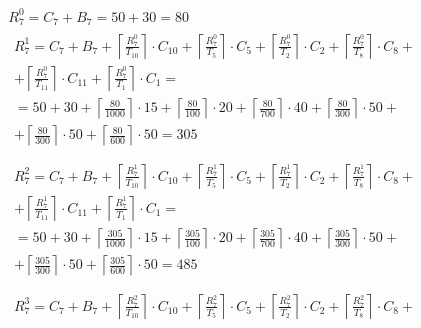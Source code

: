 \begin{gather*}
  R_7^0 = C_7 + B_7 = 50 + 30 = 80 \\
  \begin{multlined}
    R_7^1 = C_7 + B_7 + \left\lceil\frac{R_7^0}{T_{10}}\right\rceil\cdot C_{10} + %
    \left\lceil\frac{R_7^0}{T_5}\right\rceil\cdot C_5 + %
    \left\lceil\frac{R_7^0}{T_2}\right\rceil\cdot C_2 + %
    \left\lceil\frac{R_7^0}{T_8}\right\rceil\cdot C_8 + \\%
    + \left\lceil\frac{R_7^0}{T_{11}}\right\rceil\cdot C_{11} + %
    \left\lceil\frac{R_7^0}{T_1}\right\rceil\cdot C_1 = \\%
    = 50 + 30 + \left\lceil\frac{80}{1000}\right\rceil\cdot 15 + %
    \left\lceil\frac{80}{100}\right\rceil\cdot 20 + %
    \left\lceil\frac{80}{700}\right\rceil\cdot 40 + %
    \left\lceil\frac{80}{300}\right\rceil\cdot 50 + \\%
    + \left\lceil\frac{80}{300}\right\rceil\cdot 50 + %
    \left\lceil\frac{80}{600}\right\rceil\cdot 50 = 305 \\
  \end{multlined} \\
  \begin{multlined}
    R_7^2 = C_7 + B_7 + \left\lceil\frac{R_7^1}{T_{10}}\right\rceil\cdot C_{10} + %
    \left\lceil\frac{R_7^1}{T_5}\right\rceil\cdot C_5 + %
    \left\lceil\frac{R_7^1}{T_2}\right\rceil\cdot C_2 + %
    \left\lceil\frac{R_7^1}{T_8}\right\rceil\cdot C_8 + \\%
    + \left\lceil\frac{R_7^1}{T_{11}}\right\rceil\cdot C_{11} + %
    \left\lceil\frac{R_7^1}{T_1}\right\rceil\cdot C_1 = \\%
    = 50 + 30 + \left\lceil\frac{305}{1000}\right\rceil\cdot 15 + %
    \left\lceil\frac{305}{100}\right\rceil\cdot 20 + %
    \left\lceil\frac{305}{700}\right\rceil\cdot 40 + %
    \left\lceil\frac{305}{300}\right\rceil\cdot 50 + \\%
    + \left\lceil\frac{305}{300}\right\rceil\cdot 50 + %
    \left\lceil\frac{305}{600}\right\rceil\cdot 50 = 485 \\
  \end{multlined} \\
  \begin{multlined}
    R_7^3 = C_7 + B_7 + \left\lceil\frac{R_7^2}{T_{10}}\right\rceil\cdot C_{10} + %
    \left\lceil\frac{R_7^2}{T_5}\right\rceil\cdot C_5 + %
    \left\lceil\frac{R_7^2}{T_2}\right\rceil\cdot C_2 + %
    \left\lceil\frac{R_7^2}{T_8}\right\rceil\cdot C_8 + \\%

\end{multlined}
\end{gather*}
